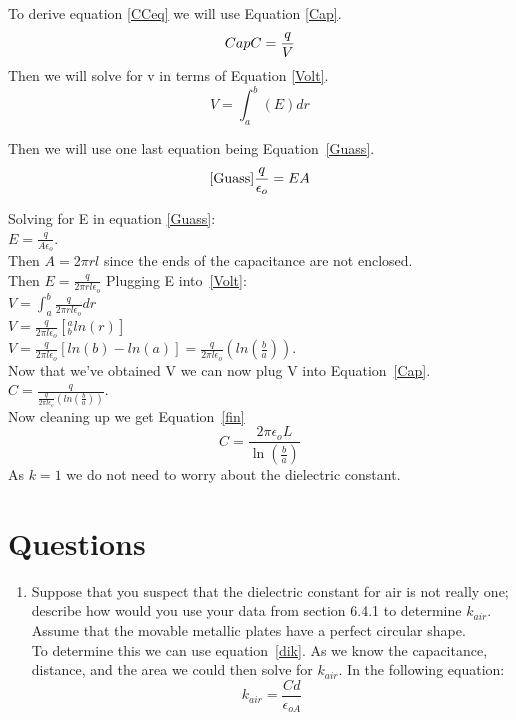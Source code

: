 \documentclass[10pt]{article}
\begin{document}
To derive equation \ref*{CCeq} we will use Equation \ref*{Cap}.\\
\begin{equation}\label*{Cap}
  C = \frac{q}{V}
\end{equation}
Then we will solve for v in terms of Equation \ref*{Volt}.\\
\begin{equation}\label{Volt}
  V = \int_{a}^{b}(E)dr
\end{equation}

Then we will use one last equation being Equation~\ref*{Guass}.\\
\begin{equation}\ref*{Guass}
  \frac{q}{\epsilon_{o}} = EA
\end{equation}

Solving for E in equation \ref*{Guass}:\\
$E = \frac{q}{A\epsilon_{o}}$.\\
Then $A = 2\pi rl$ since the ends of the capacitance are not enclosed.\\
Then $E = \frac{q}{2\pi rl\epsilon_{o}}$
Plugging E into~\ref*{Volt}:\\
$V = \int_{a}^{b}\frac{q}{2\pi rl\epsilon_{o}} dr$\\
$V = \frac{q}{2\pi l\epsilon_{o}} [_{b}^{a}ln(r)]$\\
$V = \frac{q}{2\pi l\epsilon_{o}} [ln(b) - ln(a)] = \frac{q}{2\pi l\epsilon_{o}} (ln(\frac{b}{a}))$.\\
Now that we've obtained V we can now plug V into Equation~\ref*{Cap}.\\
$C = \frac{q}{\frac{q}{2\pi l\epsilon_{o}} (ln(\frac{b}{a}))}$.\\
Now cleaning up we get Equation~\ref*{fin}\\
\begin{equation}\label{fin}
  C = \frac{2\pi\epsilon_{o}L}{\ln(\frac{b}{a})}
\end{equation}
As $k = 1$ we do not need to worry about the dielectric constant.\\

\section{Questions}
\begin{enumerate}
  \item Suppose that you suspect that the dielectric constant for air is not really one; describe how
  would you use your data from section 6.4.1 to determine $k_{air}$. Assume that the movable
  metallic plates have a perfect circular shape.\\

  To determine this we can use equation~\ref*{dik}. As we know the capacitance, distance, and the area
  we could then solve for $k_{air}$. In the following equation:
  \begin{equation}
    k_{air} = \frac{Cd}{\epsilon_{oA}}
  \end{equation}
\end{enumerate}
\end{document}
